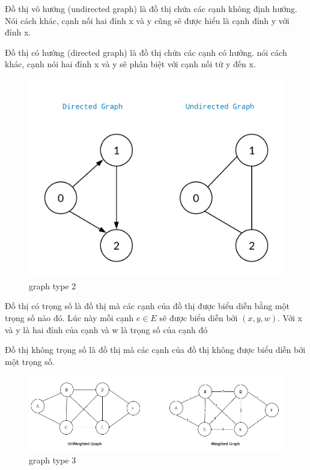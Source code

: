 Đồ thị vô hướng (undirected graph) là đồ thị chứa các cạnh không định hướng. Nói cách khác, cạnh nối hai đỉnh x và y cũng sẽ được hiểu là cạnh đỉnh y với đỉnh x.

Đồ thị có hướng (directed graph) là đồ thị chứa các cạnh có hướng. nói cách khác, cạnh nói hai đỉnh x và y sẽ phân biệt với cạnh nối từ y đến x.

\begin{figure}[H]
    \begin{center}
        \includegraphics[scale=0.2]{images/graph-type-2}
        \caption{graph type 2}
        \label{fig:graph-type-2}
    \end{center}
\end{figure}


Đồ thị có trọng số là đồ thị mà các cạnh của đồ thị được biểu diễn bằng một trọng số nào đó. Lúc này mỗi cạnh $e \in E$ sẽ được biểu diễn bởi $(x, y, w)$. Với x và y là hai đỉnh của cạnh và w là trọng số của cạnh đó

Đồ thị không trọng số là đồ thị mà các cạnh của đồ thị không được biểu diễn bởi một trọng số.

\begin{figure}[H]
    \begin{center}
        \includegraphics[scale=0.5]{images/graph-type-3}
        \caption{graph type 3}
        \label{fig:graph-type-3}
    \end{center}
\end{figure}


